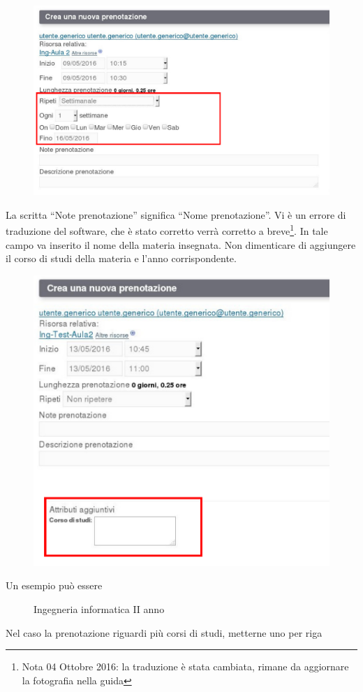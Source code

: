 \begin{figure}[H]
\centering{}\includegraphics[scale=0.5]{Immagini/prenotazione_ripetizione_2.pdf}
\normalsize
\caption{}
\label{fig:prenotazione_ripetizione_2.pdf}
\end{figure}


La scritta ``Note prenotazione'' significa ``Nome prenotazione''. Vi è un errore di traduzione
del software, che è stato corretto verrà corretto a breve\footnote{Nota 04 Ottobre 2016: la traduzione è stata
cambiata, rimane da aggiornare la fotografia nella guida}.
In tale campo va inserito il nome della materia insegnata.
Non dimenticare di aggiungere il corso di studi della materia e l'anno corrispondente.


\begin{figure}[H]
\centering{}\includegraphics[scale=0.5]{Immagini/prenotazione_attributi.pdf}
\normalsize
\caption{}
\label{fig:prenotazione_attributi.pdf}
\end{figure}

Un esempio può essere

\begin{figure}[H]
 \centering{} Ingegneria informatica II anno
\normalsize
\end{figure}

Nel caso la prenotazione riguardi più corsi di studi, metterne uno per riga
